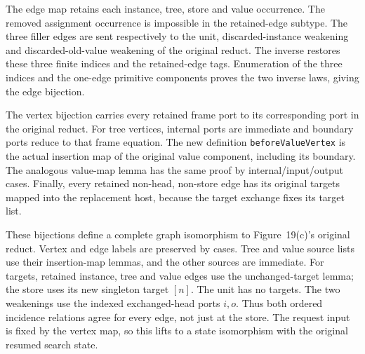 
The edge map retains each instance, tree, store and value occurrence.
The removed assignment occurrence is impossible in the retained-edge subtype.
The three filler edges are sent respectively to the unit, discarded-instance
weakening and discarded-old-value weakening of the original reduct. The
inverse restores these three finite indices and the retained-edge tags.
Enumeration of the three indices and the one-edge primitive components
proves the two inverse laws, giving the edge bijection.




The vertex bijection carries every retained frame port to its corresponding
port in the original reduct. For tree vertices, internal ports are immediate
and boundary ports reduce to that frame equation. The new definition
\texttt{beforeValueVertex} is the actual insertion map of the original value
component, including its boundary. The analogous value-map lemma has the same
proof by internal/input/output cases. Finally, every retained non-head,
non-store edge has its original targets mapped into the replacement host,
because the target exchange fixes its target list.






These bijections define a complete graph isomorphism to Figure~19(c)'s
original reduct. Vertex and edge labels are preserved by cases. Tree and
value source lists use their insertion-map lemmas, and the other sources
are immediate. For targets, retained instance, tree and value edges use the
unchanged-target lemma; the store uses its new singleton target $[n]$.
The unit has no targets. The two weakenings use the indexed exchanged-head
ports $i,o$. Thus both ordered incidence relations agree for every edge,
not just at the store. The request input is fixed by the vertex map, so this
lifts to a state isomorphism with the original resumed search state.


